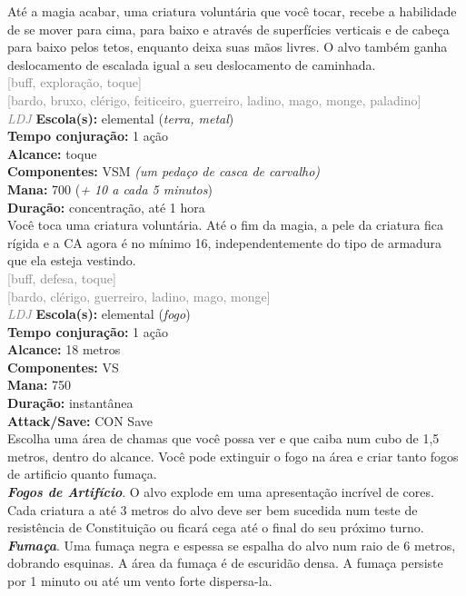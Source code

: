\documentclass{RPG_Adventure}[2021/10/20]
\begin{document}
{\normalsize Até a magia acabar, uma criatura voluntária que você tocar, recebe a habilidade de se mover para cima, para baixo e através de superfícies verticais e de cabeça para baixo pelos tetos, enquanto deixa suas mãos livres. O alvo também ganha deslocamento de escalada igual a seu deslocamento de caminhada.\\}
{\scriptsize \textcolor{gray}{[buff, exploração, toque]\\}}
{\scriptsize \textcolor{gray}{[bardo, bruxo, clérigo, feiticeiro, guerreiro, ladino, mago, monge, paladino]\\}}
{\tiny \textcolor{gray}{\textit{LDJ}}}
{\small \t \textbf{Escola(s):} elemental (\textit{terra, metal})\\\t \textbf{Tempo conjuração:} 1 ação\\\t \textbf{Alcance:} toque\\\t \textbf{Componentes:} VSM \textit{(um pedaço de casca de carvalho)}\\\t \textbf{Mana:} 700 (\textit{+ 10 a cada 5 minutos})\\\t \textbf{Duração:} concentração, até 1 hora\\}
{\normalsize Você toca uma criatura voluntária. Até o fim da magia, a pele da criatura fica rígida e a CA agora é no mínimo 16, independentemente do tipo de armadura que ela esteja vestindo.\\}
{\scriptsize \textcolor{gray}{[buff, defesa, toque]\\}}
{\scriptsize \textcolor{gray}{[bardo, clérigo, guerreiro, ladino, mago, monge]\\}}
{\tiny \textcolor{gray}{\textit{LDJ}}}
{\small \t \textbf{Escola(s):} elemental (\textit{fogo})\\\t \textbf{Tempo conjuração:} 1 ação\\\t \textbf{Alcance:} 18 metros\\\t \textbf{Componentes:} VS\\\t \textbf{Mana:} 750\\\t \textbf{Duração:} instantânea\\\t \textbf{Attack/Save:} CON Save\\}
{\normalsize Escolha uma área de chamas que você possa ver e que caiba num cubo de 1,5 metros, dentro do alcance. Você pode extinguir o fogo na área e criar tanto fogos de artificio quanto fumaça.\\\t \textbf{\textit{Fogos de Artifício}}. O alvo explode em uma apresentação incrível de cores. Cada criatura a até 3 metros do alvo deve ser bem sucedida num teste de resistência de Constituição ou ficará cega até o final do seu próximo turno.\\\t \textbf{\textit{Fumaça}}. Uma fumaça negra e espessa se espalha do alvo num raio de 6 metros, dobrando esquinas. A área da fumaça é de escuridão densa.  A fumaça persiste por 1 minuto ou até um vento forte dispersa-la.\\}
\end{document}
